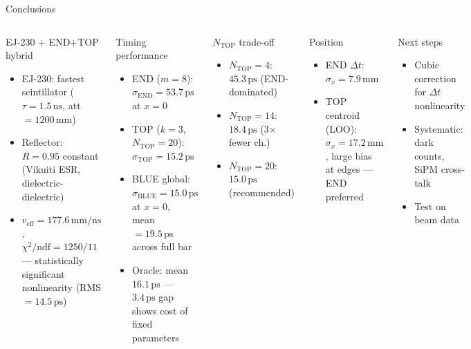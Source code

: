 \documentclass[aspectratio=169,9pt]{beamer}
\newcommand{\sEnd}{\sigma_{\mathrm{END}}}
\newcommand{\sTop}{\sigma_{\mathrm{TOP}}}
\newcommand{\sBlu}{\sigma_{\mathrm{BLUE}}}
\newcommand{\veff}{v_{\mathrm{eff}}}
\newcommand{\Ntop}{N_{\mathrm{TOP}}}
\newcommand{\ps}{\ensuremath{\,\mathrm{ps}}}
\newcommand{\ns}{\ensuremath{\,\mathrm{ns}}}
\newcommand{\mm}{\ensuremath{\,\mathrm{mm}}}
\begin{document}
\begin{frame}{Conclusions}
\begin{columns}[c]
\begin{block}{EJ-230 + END+TOP hybrid}
\begin{itemize}\setlength\itemsep{3pt}
  \item EJ-230: fastest scintillator
    ($\tau=1.5\ns$, att$=1200\mm$)
  \item Reflector: $R=0.95$ constant
    (Vikuiti ESR, dielectric-dielectric)
  \item $\veff = 177.6\mm/\mathrm{ns}$,
    $\chi^2/\mathrm{ndf}=1250/11$ — statistically
    significant nonlinearity (RMS$=14.5\ps$)
\end{itemize}
\end{block}

\begin{block}{Timing performance}
\begin{itemize}\setlength\itemsep{3pt}
  \item END ($m=8$): $\sEnd = 53.7\ps$ at $x=0$
  \item TOP ($k=3$, $\Ntop=20$): $\sTop = 15.2\ps$
  \item BLUE global: $\sBlu=15.0\ps$ at $x=0$,\\
    mean $= 19.5\ps$ across full bar
  \item Oracle: mean $16.1\ps$ — $3.4\ps$ gap
    shows cost of fixed parameters
\end{itemize}
\end{block}

\begin{block}{$\Ntop$ trade-off}
\begin{itemize}\setlength\itemsep{3pt}
  \item $\Ntop=4$: $45.3\ps$ (END-dominated)
  \item $\Ntop=14$: $18.4\ps$ (3$\times$ fewer ch.)
  \item $\Ntop=20$: $15.0\ps$ (recommended)
\end{itemize}
\end{block}

\begin{block}{Position}
\begin{itemize}\setlength\itemsep{3pt}
  \item END $\Delta t$: $\sigma_x=7.9\mm$
  \item TOP centroid (LOO): $\sigma_x=17.2\mm$,
    large bias at edges — END preferred
\end{itemize}
\end{block}

\begin{alertblock}{Next steps}
\begin{itemize}\setlength\itemsep{2pt}
  \item Cubic correction for $\Delta t$ nonlinearity
  \item Systematic: dark counts, SiPM cross-talk
  \item Test on beam data
\end{itemize}
\end{alertblock}
\end{columns}
\end{frame}
\end{document}
